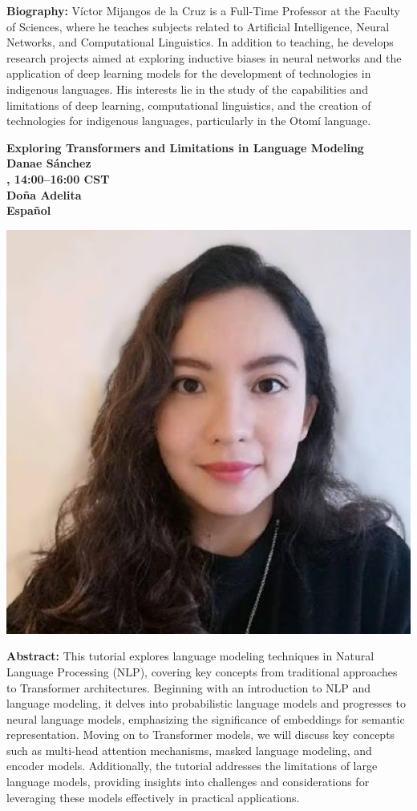 {\bfseries Biography:}
V\'ictor Mijangos de la Cruz is a Full-Time Professor at the Faculty of Sciences, where he teaches subjects related to Artificial Intelligence, Neural Networks, and Computational Linguistics. In addition to teaching, he develops research projects aimed at exploring inductive biases in neural networks and the application of deep learning models for the development of technologies in indigenous languages. His interests lie in the study of the capabilities and limitations of deep learning, computational linguistics, and the creation of technologies for indigenous languages, particularly in the Otomí language.


\clearpage
\begin{center}
{\bfseries\Large Exploring Transformers and Limitations in Language Modeling} \\
\vspace{1.0em}
{\large\bf Danae Sánchez} \\

\textbf{\daydateyear{}, 14:00--16:00 CST}\\
\textbf{Do\~na Adelita}\\
\textbf{Espa\~nol}
\end{center}

\begin{center}
    \includegraphics[width=0.4\linewidth]{content/mexican_nlp/danae.jpeg}
\end{center}

{\bfseries Abstract:}
This tutorial explores language modeling techniques in Natural Language Processing (NLP), covering key concepts from traditional approaches to Transformer architectures. Beginning with an introduction to NLP and language modeling, it delves into probabilistic language models and progresses to neural language models, emphasizing the significance of embeddings for semantic representation. Moving on to Transformer models, we will discuss key concepts such as multi-head attention mechanisms, masked language modeling, and encoder models. Additionally, the tutorial addresses the limitations of large language models, providing insights into challenges and considerations for leveraging these models effectively in practical applications.


